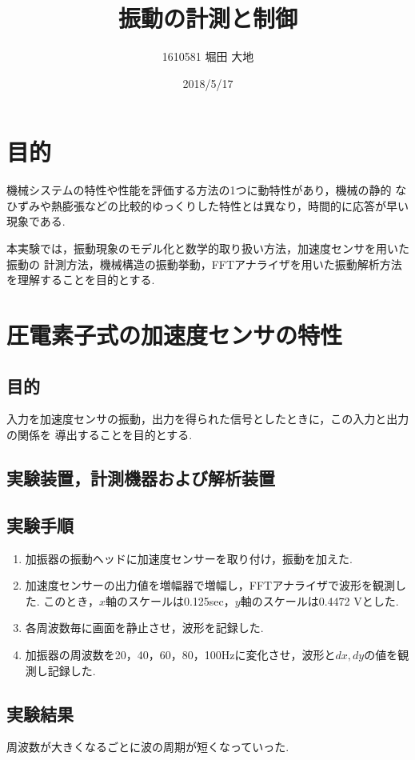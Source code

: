 \documentclass[twocolumn, 10pt,a4j]{jsarticle}
\title{\vspace{-2.5cm}振動の計測と制御}
\author{1610581 堀田 大地}
\date{2018/5/17}
\begin{document}
\maketitle{}
\section{目的}
    機械システムの特性や性能を評価する方法の1つに動特性があり，機械の静的
  なひずみや熱膨張などの比較的ゆっくりした特性とは異なり，時間的に応答が早い現象である.
    \par 本実験では，振動現象のモデル化と数学的取り扱い方法，加速度センサを用いた振動の
  計測方法，機械構造の振動挙動，FFTアナライザを用いた振動解析方法を理解することを目的とする.

\section{圧電素子式の加速度センサの特性}
  \subsection{目的}
      入力を加速度センサの振動，出力を得られた信号としたときに，この入力と出力の関係を
    導出することを目的とする.
  \subsection{実験装置，計測機器および解析装置}
  \subsection{実験手順}
    \begin{enumerate}
      \item 加振器の振動ヘッドに加速度センサーを取り付け，振動を加えた.
      \item 加速度センサーの出力値を増幅器で増幅し，FFTアナライザで波形を観測した.
      このとき，$x$軸のスケールは0.125sec，$y$軸のスケールは0.4472 Vとした.
      \item 各周波数毎に画面を静止させ，波形を記録した.
      \item 加振器の周波数を20，40，60，80，100Hzに変化させ，波形と$dx, dy$の値を観測し記録した.
    \end{enumerate}
  \subsection{実験結果}
      周波数が大きくなるごとに波の周期が短くなっていった.
\end{document}
